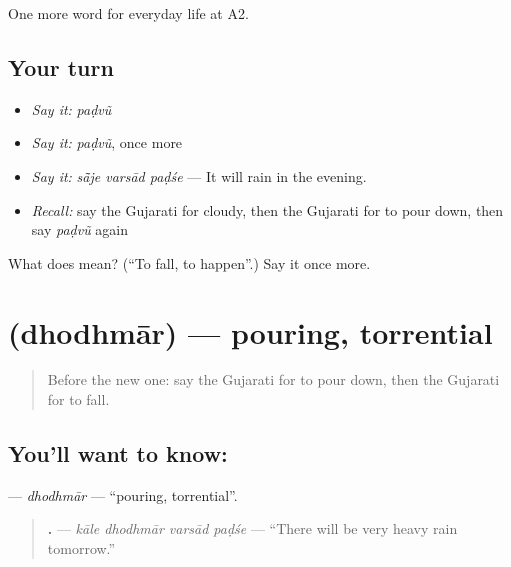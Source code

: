 \begin{grammarlens}[title={What you've built}]
One more word for everyday life at A2.
\end{grammarlens}

\subsection*{Your turn}
\begin{itemize}
\raggedright
  \item \emph{Say it:} \emph{paḍvũ}
  \item \emph{Say it:} \emph{paḍvũ}, once more
  \item \emph{Say it:} \emph{sā̃je varsād paḍśe} — It will rain in the evening.
  \item \emph{Recall:} say the Gujarati for cloudy, then the Gujarati for to pour down, then say \emph{paḍvũ} again
\end{itemize}

\begin{tcolorbox}[breakable,colback=teal!4,colframe=teal!35!black,title={Before you move on}]
What does  mean? (\textquotedblleft{}To fall, to happen\textquotedblright{}.) Say it once more.
\end{tcolorbox}
\section[\texorpdfstring{\gu{ધોધમાર} (dhodhmār)}{ધોધમાર (dhodhmār)}]{ (dhodhmār) — pouring, torrential}

\label{lesson:GU-C214-dhodhmar}



\begin{quote}
Before the new one: say the Gujarati for to pour down, then the Gujarati for to fall.
\end{quote}

\subsection*{You'll want to know: }
\textbf{} — \emph{dhodhmār} — \textquotedblleft{}pouring, torrential\textquotedblright{}.

\begin{quote}
\textbf{   .} — \emph{kāle dhodhmār varsād paḍśe} — \textquotedblleft{}There will be very heavy rain tomorrow.\textquotedblright{}
\end{quote}

